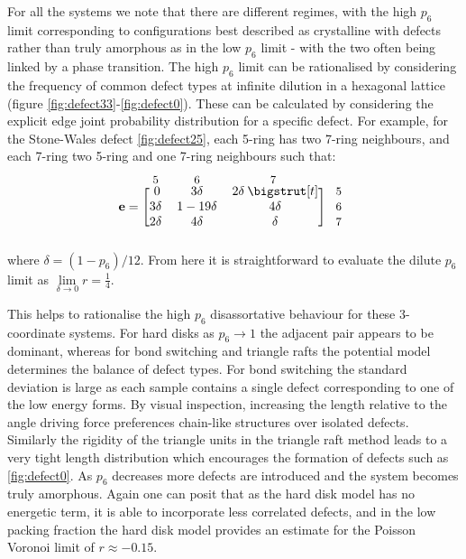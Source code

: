 For all the systems we note that there are different regimes, with the high $p_6$ limit corresponding to configurations best described as crystalline with defects rather than truly amorphous as in the low $p_6$ limit \-- with the two often being linked by a phase transition.
The high $p_6$ limit can be rationalised by considering the frequency of common defect types at infinite dilution in a hexagonal lattice \cite{Marcus1997,Bjorkman2013} (figure \ref{fig:defect33}\--\ref{fig:defect0}).
These can be calculated by considering the explicit edge joint probability distribution for a specific defect.
For example, for the Stone\--Wales defect \ref{fig:defect25}, each 5\--ring has two 7\--ring neighbours, and each 7\--ring two 5\--ring and one 7\--ring neighbours such that:
\begin{equation}
        \mathbf{e} = \begin{blockarray}{*{3}{c} l}
        \begin{block}{*{3}{>{$\footnotesize}c<{$}} l}
        5 & 6 & 7 \vspace{-1mm}\\
        \end{block}
        \begin{block}{[*{3}{c}]>{$\footnotesize}l<{$}}
        \:0 & 3\delta & 2\delta \: \bigstrut[t]& \:5\\
        3\delta & 1-19\delta & 4\delta & \:6 \\
        2\delta & 4\delta & \delta & \:7\\
        \end{block}
        \end{blockarray}
\end{equation}
where $\delta=\left(1-p_6\right)/12$.
From here it is straightforward to evaluate the dilute $p_6$ limit as $\lim\limits_{\delta\rightarrow 0} r = \frac{1}{4}$.

This helps to rationalise the high $p_6$ disassortative behaviour for these 3\--coordinate systems.
For hard disks as $p_6\rightarrow 1$ the adjacent pair appears to be dominant, whereas for bond switching and triangle rafts the potential model determines the balance of defect types.
For bond switching the standard deviation is large as each sample contains a single defect corresponding to one of the low energy forms.
By visual inspection, increasing the length relative to the angle driving force preferences chain\--like structures over isolated defects.
Similarly the rigidity of the triangle units in the triangle raft method leads to a very tight length distribution which encourages the formation of defects such as \ref{fig:defect0}.
As $p_6$ decreases more defects are introduced and the system becomes truly amorphous.
Again one can posit that as the hard disk model has no energetic term, it is able to incorporate less correlated defects, and in the low packing fraction the hard disk model provides an estimate for the Poisson Voronoi limit of $r\approx-0.15$.


